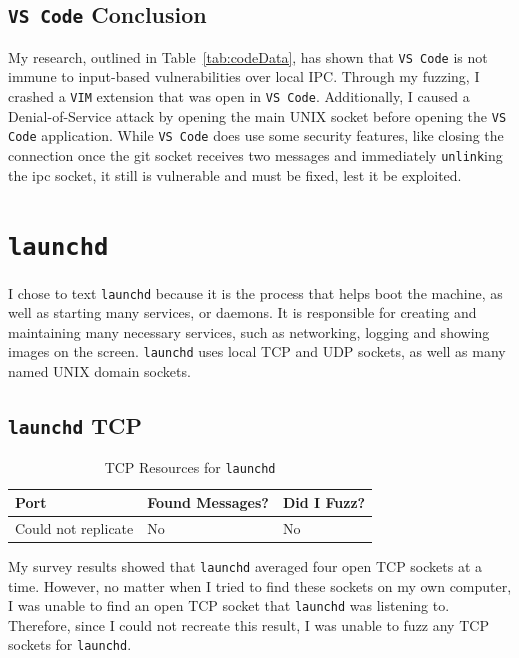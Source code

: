 \subsection{\texttt{VS Code} Conclusion}
\label{sec:codeConclusion}
My research, outlined in Table~\ref{tab:codeData}, has shown that \texttt{VS Code} is not immune to input-based vulnerabilities over local IPC.  Through my fuzzing, I crashed a \texttt{VIM} extension that was open in \texttt{VS Code}.  Additionally, I caused a Denial-of-Service attack by opening the main UNIX socket before opening the \texttt{VS Code} application.  While \texttt{VS Code} does use some security features, like closing the connection once the git socket receives two messages and immediately \texttt{unlink}ing the ipc socket, it still is vulnerable and must be fixed, lest it be exploited.

\section{\texttt{launchd}}
\label{sec:launchd}
I chose to text \texttt{launchd} because it is the process that helps boot the machine, as well as starting many services, or daemons.  It is responsible for creating and maintaining many necessary services, such as networking, logging and showing images on the screen.  \texttt{launchd} uses local TCP and UDP sockets, as well as many named UNIX domain sockets.

\subsection{\texttt{launchd} TCP}
\label{sec:launchdTcp}

\begin{table}
\centering
\begin{normalsize}
\begin{tabular}{ l | l | l }
\textbf{Port} & \textbf{Found Messages?} & \textbf{Did I Fuzz?} \\ \hline
Could not replicate & No & No \\ \hline
\end{tabular}
\caption{TCP Resources for \texttt{launchd}}
\label{tab:launchdTcp}
\end{normalsize}
\end{table} 

My survey results showed that \texttt{launchd} averaged four open TCP sockets at a time.  However, no matter when I tried to find these sockets on my own computer, I was unable to find an open TCP socket that \texttt{launchd} was listening to.  Therefore, since I could not recreate this result, I was unable to fuzz any TCP sockets for \texttt{launchd}.

